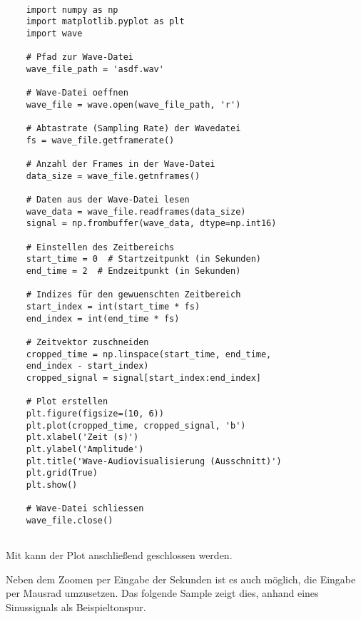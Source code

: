 \begin{verbatim}
    
    import numpy as np
    import matplotlib.pyplot as plt
    import wave
    
    # Pfad zur Wave-Datei
    wave_file_path = 'asdf.wav'
    
    # Wave-Datei oeffnen
    wave_file = wave.open(wave_file_path, 'r')
    
    # Abtastrate (Sampling Rate) der Wavedatei
    fs = wave_file.getframerate()
    
    # Anzahl der Frames in der Wave-Datei
    data_size = wave_file.getnframes()
    
    # Daten aus der Wave-Datei lesen
    wave_data = wave_file.readframes(data_size)
    signal = np.frombuffer(wave_data, dtype=np.int16)
    
    # Einstellen des Zeitbereichs
    start_time = 0  # Startzeitpunkt (in Sekunden)
    end_time = 2  # Endzeitpunkt (in Sekunden)
    
    # Indizes für den gewuenschten Zeitbereich
    start_index = int(start_time * fs)
    end_index = int(end_time * fs)
    
    # Zeitvektor zuschneiden
    cropped_time = np.linspace(start_time, end_time, 
    end_index - start_index)
    cropped_signal = signal[start_index:end_index]
    
    # Plot erstellen
    plt.figure(figsize=(10, 6))
    plt.plot(cropped_time, cropped_signal, 'b')
    plt.xlabel('Zeit (s)')
    plt.ylabel('Amplitude')
    plt.title('Wave-Audiovisualisierung (Ausschnitt)')
    plt.grid(True)
    plt.show()
    
    # Wave-Datei schliessen
    wave_file.close()
    
\end{verbatim}

Mit  kann der Plot anschließend geschlossen werden.

Neben dem Zoomen per Eingabe der Sekunden ist es auch möglich, die Eingabe per Mausrad umzusetzen. Das folgende Sample zeigt dies, anhand eines Sinussignals als Beispieltonspur.


